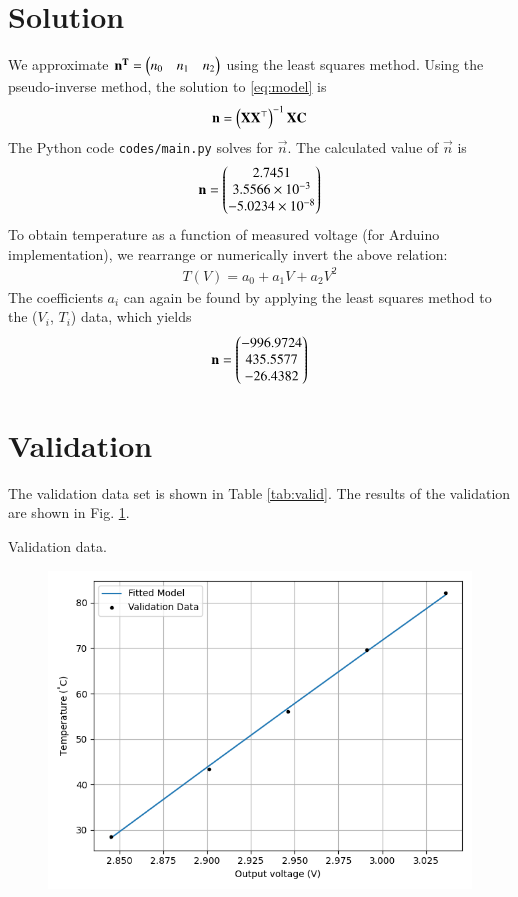 \documentclass[journal,12pt,onecolumn]{IEEEtran}
\begin{document}
\section{\textbf{Solution}}
We approximate $\mathbf{n^T} = \begin{pmatrix}n_0 & n_1 & n_2\end{pmatrix}$ using the least squares method. Using the pseudo-inverse method, the solution to \eqref{eq:model} is
\begin{align}
    \mathbf{n} = \left(\mathbf{XX}^\top\right)^{-1}\mathbf{X}\mathbf{C}
\end{align}
The Python code \texttt{codes/main.py} solves for $\vec{n}$.
The calculated value of $\vec{n}$ is
\begin{align}
    \mathbf{n} = \begin{pmatrix}2.7451\\3.5566\times10^{-3}\\-5.0234\times10^{-8}\end{pmatrix}
    \label{eq:opt-theta-1}
\end{align}
To obtain temperature as a function of measured voltage (for Arduino implementation), we rearrange or numerically invert the above relation:
\begin{align}
T(V) = a_0 + a_1V + a_2V^2
\end{align}
The coefficients $a_i$ can again be found by applying the least squares method to the ($V_i$, $T_i$)
data, which yields
\begin{align}
    \mathbf{n} = \begin{pmatrix}-996.9724\\435.5577\\-26.4382\end{pmatrix}
    \label{eq:opt-theta-2}
\end{align}


\section{\textbf{Validation}}
The validation data set is shown in Table \ref{tab:valid}. The results of the
validation are shown in Fig. \ref{fig:valid}.
\begin{table}[H]
    \centering
    
    \caption{Validation data.}
    \label{tab:valid}
\end{table}
\begin{figure}[H]
    \centering
    \includegraphics[width=0.6\columnwidth]{figs/temp_vs_voltage/valid.png}
    \label{fig:valid}
\end{figure}
\end{document}
